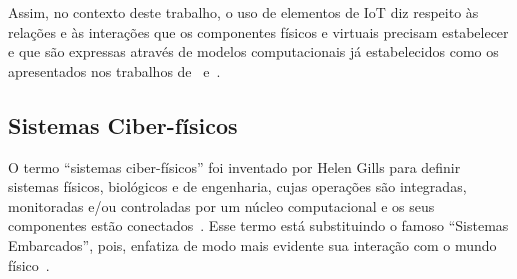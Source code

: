 Assim, no contexto deste trabalho, o uso de elementos de IoT diz respeito às relações e às interações que os componentes físicos e virtuais precisam estabelecer e que são expressas através de modelos computacionais já estabelecidos como os apresentados nos trabalhos de~\cite{Chang:2014} e~\cite{serbanati:2011}.




\subsection{Sistemas Ciber-físicos}\label{section:ciberfisico}
O termo ``sistemas ciber-físicos'' foi inventado por Helen Gills para definir sistemas físicos, biológicos e de engenharia, cujas operações são integradas, monitoradas e/ou controladas por um núcleo computacional e os seus componentes estão conectados~\citep{wade:2015}. Esse termo está substituindo o famoso ``Sistemas Embarcados'', pois, enfatiza de modo mais evidente sua interação com o mundo físico~\citep{helps:2013}.

